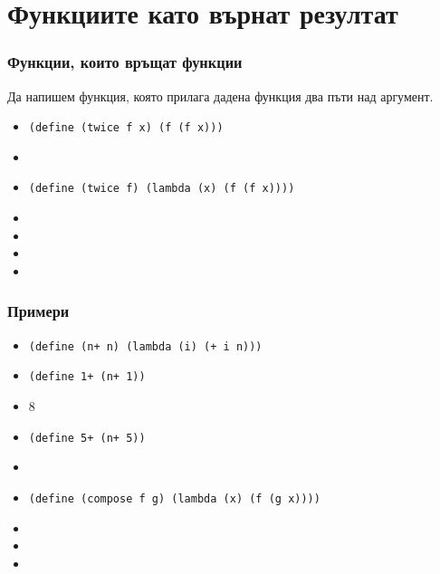 \documentclass{beamer}
\begin{document}
\section{Функциите като върнат резултат}

\begin{frame}
  \frametitle{Функции, които връщат функции}

  Да напишем функция, която прилага дадена функция два пъти над аргумент.

  \begin{itemize}[<+->]
  \item \tt{(define (twice f x) (f (f x)))}
  \item {}
  \item \tt{(define (twice f) (lambda (x) (f (f x))))}
  \item {}
  \item {}
  \item {}
  \item {}
  \end{itemize}
\end{frame}

\begin{frame}
  \frametitle{Примери}

  \begin{itemize}[<+->]
  \item \tt{(define (n+ n) (lambda (i) (+ i n)))}
  \item \tt{(define 1+ (n+ 1))}
  \item {}8
  \item \tt{(define 5+ (n+ 5))}
  \item {}
  \item \tt{(define (compose f g) (lambda (x) (f (g x))))}
  \item {}
  \item {}
  \item {}
  \end{itemize}
\end{frame}
\end{document}
